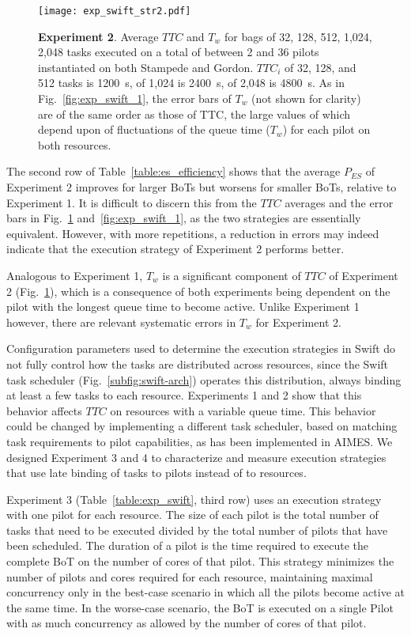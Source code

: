 \documentclass[10pt, conference, compsocconf]{IEEEtran}
\newcommand{\B}[1]{\textbf{#1}\xspace}
\begin{document}
\begin{figure}
  \centering
  \texttt{[image: exp\_swift\_str2.pdf]}
  \caption{ \B{Experiment 2}. Average \(TTC\) and \(T_w\) for bags of 32, 128,
            512, 1,024, 2,048 tasks executed on a total of between 2 and 36
            pilots instantiated on both Stampede and Gordon. \(TTC_i\) of 32,
            128, and 512 tasks is 1200~s, of 1,024 is 2400~s, of 2,048 is 4800~s.
            As in Fig.~\ref{fig:exp_swift_1}, the error bars of \(T_w\) (not
            shown for clarity) are of the same order as those of TTC, the
            large values of which depend upon of fluctuations of the queue
            time (\(T_w\)) for each pilot on both
            resources.}\label{fig:exp_swift_2}
\end{figure}

The second row of Table~\ref{table:es_efficiency} shows that the average
\(P_{ES}\) of Experiment 2 improves for larger BoTs but worsens for smaller
BoTs, relative to Experiment 1.  It is difficult to discern this from the
\(TTC\) averages and the error bars in Fig.~\ref{fig:exp_swift_2}
and~\ref{fig:exp_swift_1}, as the two strategies are essentially equivalent.
However, with more repetitions, a reduction in errors may indeed indicate
that the execution strategy of Experiment 2 performs better.

Analogous to Experiment 1, \(T_w\) is a significant component of \(TTC\) of
Experiment 2 (Fig.~\ref{fig:exp_swift_2}),  which is a consequence of both
experiments being dependent on the pilot with the longest queue time to
become active. Unlike Experiment 1 however, there are relevant systematic
errors in \(T_w\) for Experiment 2.

Configuration parameters used to determine the execution strategies in Swift do
not fully control how the tasks are distributed across resources, since the
Swift task scheduler (Fig.~\ref{subfig:swift-arch}) operates this distribution,
always binding at least a few tasks to each resource. Experiments 1 and 2 show
that this behavior affects \(TTC\) on resources with a variable queue time. This
behavior could be changed by implementing a different task scheduler, based on
matching task requirements to pilot capabilities, as has been implemented in
AIMES\@. We designed Experiment 3 and 4 to characterize and measure execution
strategies that use late binding of tasks to pilots instead of to resources.

Experiment 3 (Table~\ref{table:exp_swift}, third row) uses an execution
strategy with one pilot for each resource. The size of each pilot is the
total number of tasks that need to be executed divided by the total number of
pilots that have been scheduled. The duration of a pilot is the time required
to execute the complete BoT on the number of cores of that pilot. This
strategy minimizes the number of pilots and cores required for each resource,
maintaining maximal concurrency only in the best-case scenario in which all
the pilots become active at the same time. In the worse-case scenario, the
BoT is executed on a single Pilot with as much concurrency as allowed by the
number of cores of that pilot.
\end{document}

